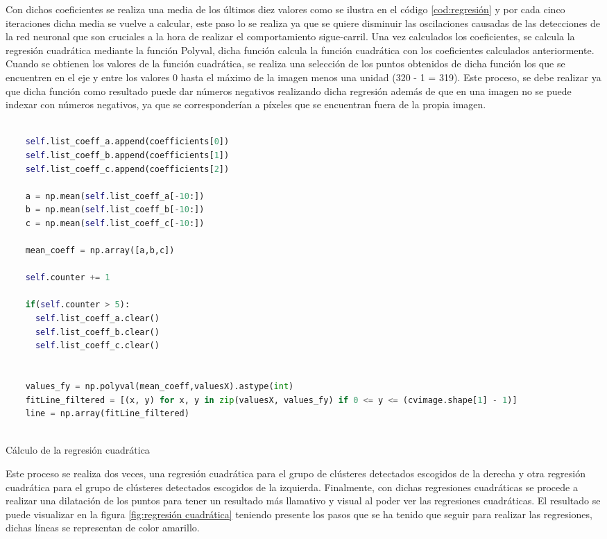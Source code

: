 Con dichos coeficientes se realiza una media de los últimos diez valores como se ilustra en el código \ref{cod:regresión} y por cada cinco iteraciones dicha media se vuelve a calcular, este paso lo se realiza ya que 
se quiere disminuir las oscilaciones causadas de las detecciones de la red neuronal que son cruciales a la hora de realizar el comportamiento sigue-carril. Una vez calculados los coeficientes, se calcula la regresión cuadrática mediante la función Polyval, dicha función calcula
la función cuadrática con los coeficientes calculados anteriormente. \newline 
Cuando se obtienen los valores de la función cuadrática, se realiza una selección de los puntos obtenidos
de dicha función los que se encuentren en el eje y entre los valores 0 hasta el máximo de la imagen menos una unidad (320 - 1 = 319). Este proceso, 
se debe realizar ya que dicha función como resultado puede dar números negativos realizando dicha regresión además de que en una imagen no se puede indexar con números negativos, ya que
se corresponderían a píxeles que se encuentran fuera de la propia imagen. \newline

\begin{code}[H]
  \begin{lstlisting}[language=Python]

    self.list_coeff_a.append(coefficients[0])
    self.list_coeff_b.append(coefficients[1])
    self.list_coeff_c.append(coefficients[2])

    a = np.mean(self.list_coeff_a[-10:])
    b = np.mean(self.list_coeff_b[-10:])
    c = np.mean(self.list_coeff_c[-10:])

    mean_coeff = np.array([a,b,c])

    self.counter += 1

    if(self.counter > 5):
      self.list_coeff_a.clear()
      self.list_coeff_b.clear()
      self.list_coeff_c.clear()  


    values_fy = np.polyval(mean_coeff,valuesX).astype(int)
    fitLine_filtered = [(x, y) for x, y in zip(valuesX, values_fy) if 0 <= y <= (cvimage.shape[1] - 1)]
    line = np.array(fitLine_filtered)
   

  \end{lstlisting}
  \caption[Cálculo de la regresión cuadrática]{Cálculo de la regresión cuadrática}
  \label{cod:regresión}
  \end{code}  

Este proceso se realiza dos veces, una regresión cuadrática para el grupo de clústeres detectados escogidos de la derecha y otra regresión cuadrática para el grupo de clústeres detectados
escogidos de la izquierda. \newline
Finalmente, con dichas regresiones cuadráticas se procede a realizar una dilatación de los puntos para tener un resultado más llamativo y visual al poder
ver las regresiones cuadráticas. El resultado se puede visualizar en la figura \ref{fig:regresión cuadrática} teniendo presente los pasos que se ha tenido que seguir para 
realizar las regresiones, dichas líneas se representan de color amarillo.

